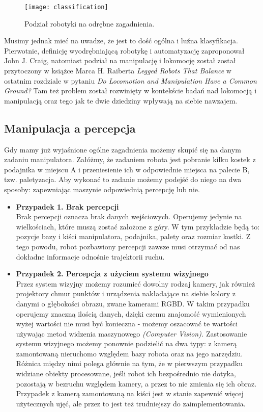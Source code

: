 \documentclass[12pt]{article}
\begin{document}
\begin{figure}[h]
\centering
\texttt{[image: classification]}
\caption{Podział robotyki na odrębne zagadnienia.}
\end{figure}

Musimy jednak mieć na uwadze, że jest to dość ogólna i luźna klasyfikacja. Pierwotnie, definicję wyodrębniającą robotykę i automatyzację zaproponował John J. Craig, natomiast podział na manipulację i lokomocję został został przytoczony w książce Marca H. Raiberta \emph{Legged Robots That Balance} w ostatnim rozdziale w pytaniu \emph{Do Locomotion and Manipulation Have a Common Ground?} Tam też problem został rozwinięty w kontekście badań nad lokomocją i manipulacją oraz tego jak te dwie dziedziny wpływają na siebie nawzajem.

\subsection{Manipulacja a percepcja}
Gdy mamy już wyjaśnione ogólne zagadnienia możemy skupić się na danym zadaniu manipulatora. Załóżmy, że zadaniem robota jest pobranie kilku kostek z podajnika w miejscu A i przeniesienie ich w odpowiednie miejsca na palecie B, tzw. paletyzacja. Aby wykonać to zadanie możemy podejść do niego na dwa sposoby: zapewniając maszynie odpowiednią percepcję lub nie. 

\begin{itemize}
\item \textbf{Przypadek 1. Brak percepcji} \\
Brak percepcji oznacza brak danych wejściowych. Operujemy jedynie na wielkościach, które muszą zostać założone z góry. W tym przykładzie będą to: pozycje bazy i kiści manipulatora, podajnika, palety oraz rozmiar kostki. Z tego powodu, robot pozbawiony percepcji zawsze musi otrzymać od nas dokładne informacje odnośnie trajektorii ruchu.

\item \textbf{Przypadek 2. Percepcja z użyciem systemu wizyjnego} \\
Przez system wizyjny możemy rozumieć dowolny rodzaj kamery, jak również projektory chmur punktów i urządzenia nakładające na siebie kolory z danymi o głębokości obrazu, zwane kamerami RGBD. W takim przypadku operujemy znaczną ilością danych, dzięki czemu znajomość wymienionych wyżej wartości nie musi być konieczna - możemy oszacować te wartości używając metod widzenia maszynowego \emph{(Computer Vision).} Zastosowanie systemu wizyjnego możemy ponownie podzielić na dwa typy: z kamerą zamontowaną nieruchomo względem bazy robota oraz na jego narzędziu. Różnica między nimi polega głównie na tym, że w pierwszym przypadku widziane obiekty procesowane, jeśli robot ich bezpośrednio nie dotyka, pozostają w bezruchu względem kamery, a przez to nie zmienia się ich obraz. Przypadek z kamerą zamontowaną na kiści jest w stanie zapewnić więcej użytecznych ujęć, ale przez to jest też trudniejszy do zaimplementowania.
\end{itemize}
\end{document}
